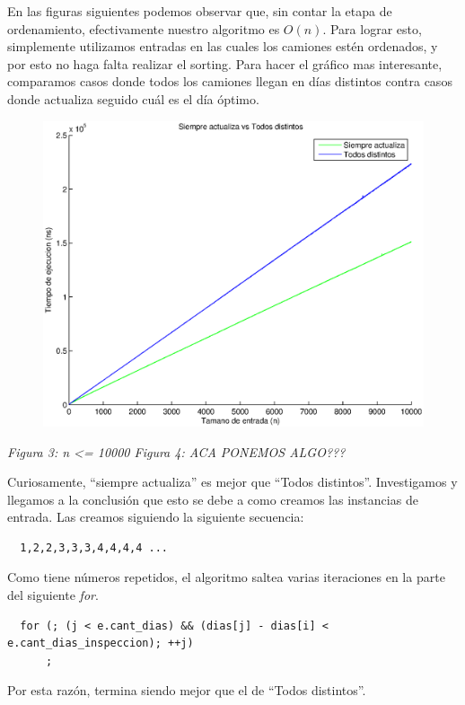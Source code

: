 En las figuras siguientes podemos observar que, sin contar la etapa de ordenamiento, efectivamente nuestro algoritmo es $O(n)$. Para lograr esto, simplemente utilizamos entradas en las cuales los camiones estén ordenados, y por esto no haga falta realizar el sorting. Para hacer el gráfico mas interesante, comparamos casos donde todos los camiones llegan en días distintos contra casos donde actualiza seguido cuál es el día óptimo.

  \begin{figure}[H]
    \includegraphics[width=0.5\linewidth]{problema1/graficos/problema1_ordenada_siempre_actualiza_10000_vs_problema1_ordenada_todos_distintos_10000.eps}
\end{figure}
\emph{\hspace{2,5cm}Figura 3: n <= 10000 \hspace{3cm}Figura 4: ACA PONEMOS ALGO???}

Curiosamente, ``siempre actualiza'' es mejor que ``Todos distintos''. Investigamos y llegamos a la conclusión que esto se debe a como creamos las instancias de entrada. Las creamos siguiendo la siguiente secuencia:

\begin{verbatim}
  1,2,2,3,3,3,4,4,4,4 ...
\end{verbatim}

Como tiene números repetidos, el algoritmo saltea varias iteraciones en la parte del siguiente \emph{for}.

\begin{verbatim}
  for (; (j < e.cant_dias) && (dias[j] - dias[i] < e.cant_dias_inspeccion); ++j)
      ;
\end{verbatim}

Por esta razón, termina siendo mejor que el de ``Todos distintos''.
